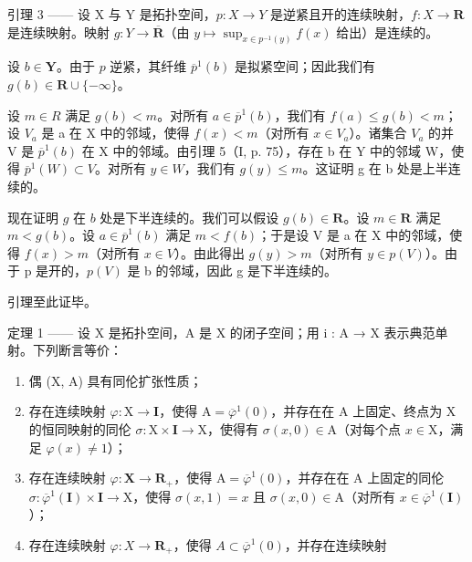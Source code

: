 引理 3 —— 设 X 与 Y 是拓扑空间，\(p \colon X \to Y\) 是逆紧且开的连续映射，\(f \colon X \to \mathbf{R}\) 是连续映射。映射 \(g \colon Y \to \overline{\mathbf{R}}\)（由 \(y \mapsto \sup_{x\in p^{-1}(y)} f(x)\) 给出）是连续的。

设 \(b \in \mathbf{Y}\)。由于 \(p\) 逆紧，其纤维 \(\overline{p}^1(b)\) 是拟紧空间；因此我们有 \(g(b) \in \mathbf{R} \cup \{-\infty\}\)。

设 \(m \in R\) 满足 \(g(b) < m\)。对所有 \(a \in \overline{p}^{1}(b)\)，我们有 \(f(a) \leqslant g(b) < m\)；设 \(V_{a}\) 是 a 在 X 中的邻域，使得 \(f(x) < m\)（对所有 \(x \in V_{a}\)）。诸集合 \(V_{a}\) 的并 V 是 \(\overline{p}^{1}(b)\) 在 X 中的邻域。由引理 5（I, p. 75），存在 b 在 Y 中的邻域 W，使得 \(\overline{p}^{1}(W) \subset V\)。对所有 \(y \in W\)，我们有 \(g(y) \leqslant m\)。这证明 g 在 b 处是上半连续的。

现在证明 \(g\) 在 \(b\) 处是下半连续的。我们可以假设 \(g(b)\in\mathbf{R}\)。设 \(m\in\mathbf{R}\) 满足 \(m<g(b)\)。设 \(a\in\overline{p}^1(b)\) 满足 \(m<f(b)\)；于是设 V 是 a 在 X 中的邻域，使得 \(f(x)>m\)（对所有 \(x\in V\)）。由此得出 \(g(y)>m\)（对所有 \(y\in p(V)\)）。由于 p 是开的，\(p(V)\) 是 b 的邻域，因此 g 是下半连续的。

引理至此证毕。

定理 1 —— 设 X 是拓扑空间，A 是 X 的闭子空间；用 i : A → X 表示典范单射。下列断言等价：

\begin{enumerate}
\def\labelenumi{(\roman{enumi})}
\item
  偶 (X, A) 具有同伦扩张性质；
\item
  存在连续映射 \(\varphi\colon\mathrm{X}\to\mathbf{I}\)，使得 \(\mathrm{A}=\overline{\varphi}^{1}(0)\)，并存在在 A 上固定、终点为 X 的恒同映射的同伦 \(\sigma\colon\mathrm{X}\times\mathbf{I}\to\mathrm{X}\)，使得有 \(\sigma(x,0)\in\mathrm{A}\)（对每个点 \(x\in\mathrm{X}\)，满足 \(\varphi(x)\neq1\)）；
\item
  存在连续映射 \(\varphi\colon\mathbf{X}\to\mathbf{R}_{+}\)，使得 \(\mathrm{A}=\overline{\varphi}^{1}(0)\)，并存在在 A 上固定的同伦 \(\sigma\colon\overline{\varphi}^{1}(\mathbf{I})\times\mathbf{I}\to\mathrm{X}\)，使得 \(\sigma(x,1)=x\) 且 \(\sigma(x,0)\in\mathrm{A}\)（对所有 \(x\in\overline{\varphi}^{1}(\mathbf{I})\)）；
\item
  存在连续映射 \(\varphi\colon X\to\mathbf{R}_{+}\)，使得 \(A\subset\overline{\varphi}^{1}(0)\)，并存在连续映射
\end{enumerate}


